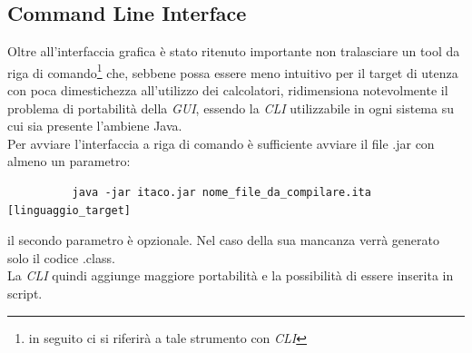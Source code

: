 \documentclass[11pt, a4paper, twoside, notitlepage]{report}
\begin{document}
\subsection{Command Line Interface}
Oltre all'interfaccia grafica è stato ritenuto importante non tralasciare un
tool da riga di comando\footnote{in seguito ci si riferirà a tale strumento
con \emph{CLI}} che, sebbene possa essere meno intuitivo per il target di utenza
con poca dimestichezza all'utilizzo dei calcolatori, ridimensiona notevolmente
il problema di portabilità della \emph{GUI}, essendo la \emph{CLI} utilizzabile
in ogni sistema su cui sia presente l'ambiene Java.
\\Per avviare l'interfaccia a riga di comando è sufficiente avviare il file .jar
con almeno un parametro:
\begin{verbatim}
          java -jar itaco.jar nome_file_da_compilare.ita [linguaggio_target]
\end{verbatim}
il secondo parametro è opzionale. Nel caso della sua mancanza verrà generato
solo il codice .class.
\\La \emph{CLI} quindi aggiunge maggiore portabilità e la
possibilità di essere inserita in script.
\end{document}
